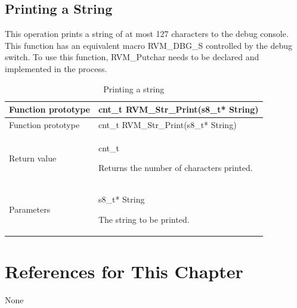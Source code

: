\subsection{Printing a String}\label{subsec:3-6-8}

This operation prints a string of at most 127 characters to the debug console. This function has an equivalent macro RVM\_DBG\_S controlled by the debug switch. To use this function, RVM\_Putchar needs to be declared and implemented in the process.

\begin{xltabular}{\textwidth}{@{}>{\hsize\raggedright\arraybackslash}X>{\hsize\raggedright\arraybackslash}X@{}}
\caption{Printing a string}\label{tab:3-21}\\
\toprule
Function prototype & cnt\_\allowbreak{}t RVM\_\allowbreak{}Str\_\allowbreak{}Print(s8\_\allowbreak{}t* String)\tabularnewline
\endfirsthead
\toprule
Function prototype & cnt\_\allowbreak{}t RVM\_\allowbreak{}Str\_\allowbreak{}Print(s8\_\allowbreak{}t* String)\tabularnewline
\midrule
\endhead
\bottomrule
\endlastfoot
Return value\strut
 & cnt\_\allowbreak{}t

Returns the number of characters printed.\strut
\tabularnewline
Parameters\strut
 & s8\_\allowbreak{}t* String

The string to be printed.\strut
\tabularnewline
\end{xltabular}

\section{References for This Chapter}\label{sec:3-7}

None

